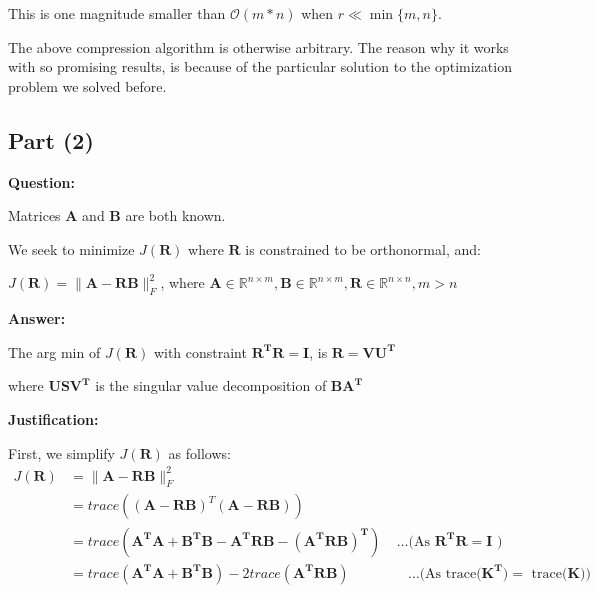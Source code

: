 \documentclass[fleqn, 11pt]{article}
\newcommand{\bs}[1]{\boldsymbol{#1}}
\begin{document}
This is one magnitude smaller than $\mathcal{O}(m*n)$ when $r \ll \min\{m,n\}$. 

The above compression algorithm is otherwise arbitrary. 
The reason why it works with so promising results, is because of  
the particular solution to the optimization problem we solved before.



\newpage

\subsection*{Part (2) }

\textbf{Question: }

\smallskip

Matrices $\bs{A}$ and $\bs{B}$ are both known.

\smallskip

We seek to minimize $J(\bs{R})$ where  $\bs{R}$ is constrained to be orthonormal, and: 
\begin{center}
    $J(\bs{R}) = \|\bs{A}-\bs{R} \bs{B}\|^2_F$, where $\bs{A} \in \mathbb{R}^{n \times m}, \bs{B} \in \mathbb{R}^{n \times m}, \bs{R} \in \mathbb{R}^{n \times n}, m > n$ 

\end{center}
\hrulefill

\medskip

\textbf{Answer: }

\medskip

The arg min of $J(\bs{R})$ with constraint $\bs{R^TR=I}$,  
is $\bs{R=VU^T}$ 

\smallskip

where $\bs{USV^T}$ is the singular value decomposition of $\bs{BA^T}$

\hrulefill

\medskip

\textbf{Justification: }

\medskip


First, we simplify $J(\bs{R})$ as follows: 
\begin{align*}
    J(\bs{R}) &= \|\bs{A}-\bs{R} \bs{B}\|^2_F \\
    &= trace((\bs{A}-\bs{RB})^T (\bs{A}-\bs{RB}))  \\
    &= trace(\bs{A^TA + B^TB -  A^TRB - ( A^TRB  )^T  }) \;\;\;\; \ldots\text{(As $\bs{R^TR=I}$  )}\\
    &= trace(\bs{A^TA + B^TB}) - 2 trace(\bs{A^TRB}) \;\;\;\;\;\;\;\; \;\;\;\; \;\;\; 
    \ldots\text{(As trace($\bs{K^T})=$ trace($\bs{K}$))}\\
\end{align*}
\end{document}
